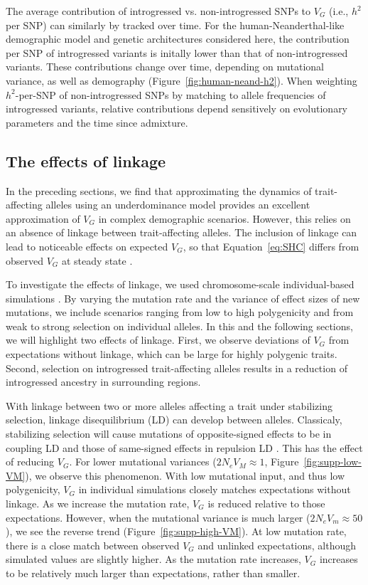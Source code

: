 \documentclass{article}
\begin{document}
The average contribution of introgressed vs. non-introgressed SNPs to $V_G$
(i.e., $h^2$ per SNP) can similarly by tracked over time. For the
human-Neanderthal-like demographic model and genetic architectures considered
here, the contribution per SNP of introgressed variants is initally lower than
that of non-introgressed variants. These contributions change over time,
depending on mutational variance, as well as demography
(Figure~\ref{fig:human-neand-h2}). When weighting $h^2$-per-SNP of
non-introgressed SNPs by matching to allele frequencies of introgressed
variants, relative contributions depend sensitively on evolutionary parameters
and the time since admixture.

\subsection*{The effects of linkage}

In the preceding sections, we find that approximating the dynamics of
trait-affecting alleles using an underdominance model
\citep{robertson1956effect} provides an excellent approximation of $V_G$ in
complex demographic scenarios. However, this relies on an absence of linkage
between trait-affecting alleles. The inclusion of linkage can lead to
noticeable effects on expected $V_G$, so that Equation~\ref{eq:SHC} differs
from observed $V_G$ at steady state
\citep{burger1989much, burger1994distribution, walsh2018evolution}.

To investigate the effects of linkage, we used chromosome-scale
individual-based simulations \citep{thornton2019polygenic}. By varying the
mutation rate and the variance of effect sizes of new mutations, we include
scenarios ranging from low to high polygenicity and from weak to strong
selection on individual alleles. In this and the following sections, we will
highlight two effects of linkage. First, we observe deviations of $V_G$ from
expectations without linkage, which can be large for highly polygenic traits.
Second, selection on introgressed trait-affecting alleles results in a
reduction of introgressed ancestry in surrounding regions.

With linkage between two or more alleles affecting a trait under stabilizing
selection, linkage disequilibrium (LD) can develop between alleles. Classicaly,
stabilizing selection will cause mutations of opposite-signed effects to be in
coupling LD and those of same-signed effects in repulsion LD
\citep{bulmer1971effect}. This has the effect of reducing $V_G$. For lower
mutational variances ($2N_e V_M\approx1$, Figure~\ref{fig:supp-low-VM}), we
observe this phenomenon. With low mutational input, and thus low polygenicity,
$V_G$ in individual simulations closely matches expectations without linkage.
As we increase the mutation rate, $V_G$ is reduced relative to those
expectations.  However, when the mutational variance is much larger
($2N_eV_m\approx 50$), we see the reverse trend
(Figure~\ref{fig:supp-high-VM}). At low mutation rate, there is a close match
between observed $V_G$ and unlinked expectations, although simulated values are
slightly higher. As the mutation rate increases, $V_G$ increases to be
relatively much larger than expectations, rather than smaller.
\end{document}
